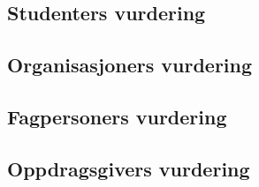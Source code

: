 \subsection{Studenters vurdering}

\subsection{Organisasjoners vurdering}

\subsection{Fagpersoners vurdering}

\subsection{Oppdragsgivers vurdering}



